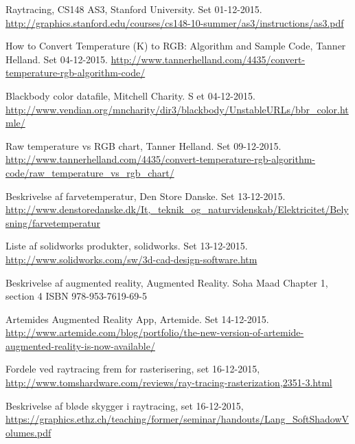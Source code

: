 \begin{thebibliography}{99}
  Raytracing, 
  CS148 AS3, Stanford University. 
  Set 01-12-2015.
  \url{http://graphics.stanford.edu/courses/cs148-10-summer/as3/instructions/as3.pdf}

  How to Convert Temperature (K) to RGB: Algorithm and   Sample Code,
  Tanner Helland.
  Set 04-12-2015.
  \url{http://www.tannerhelland.com/4435/convert-temperature-rgb-algorithm-code/}
  
  Blackbody color datafile, 
  Mitchell Charity. S
  et 04-12-2015.
  \url{http://www.vendian.org/mncharity/dir3/blackbody/UnstableURLs/bbr_color.htmle/}
  
  Raw temperature vs RGB chart,
  Tanner Helland. 
  Set 09-12-2015.
  \url{http://www.tannerhelland.com/4435/convert-temperature-rgb-algorithm-code/raw_temperature_vs_rgb_chart/}

  Beskrivelse af farvetemperatur, 
  Den Store Danske. 
  Set 13-12-2015.
  \url{http://www.denstoredanske.dk/It,_teknik_og_naturvidenskab/Elektricitet/Belysning/farvetemperatur}
  
  Liste af solidworks produkter, 
  solidworks. 
  Set 13-12-2015.
  \url{http://www.solidworks.com/sw/3d-cad-design-software.htm}

  Beskrivelse af augmented reality,
  Augmented Reality.
  Soha Maad
  Chapter 1, section 4
  ISBN 978-953-7619-69-5

  Artemides Augmented Reality App, 
  Artemide.
  Set 14-12-2015.
  \url{http://www.artemide.com/blog/portfolio/the-new-version-of-artemide-augmented-reality-is-now-available/}

  Fordele ved raytracing frem for rasterisering, set 16-12-2015,
  \url{http://www.tomshardware.com/reviews/ray-tracing-rasterization,2351-3.html}

  Beskrivelse af bløde skygger i raytracing, set 16-12-2015,
  \url{https://graphics.ethz.ch/teaching/former/seminar/handouts/Lang_SoftShadowVolumes.pdf}



  


  

  


  
\end{thebibliography}
\clearpage